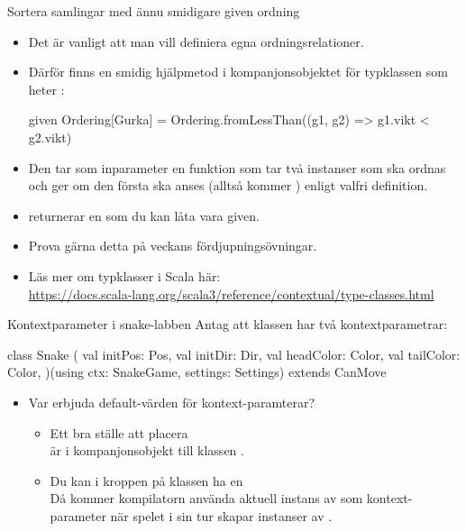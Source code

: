 \begin{Slide}{Sortera samlingar med ännu smidigare given ordning}\SlideFontSmall

\begin{itemize}
  \item Det är vanligt att man vill definiera egna ordningsrelationer.
  \item Därför finns en smidig hjälpmetod i kompanjonsobjektet för typklassen  som heter :
\begin{Code}
given Ordering[Gurka] = 
  Ordering.fromLessThan((g1, g2) => g1.vikt < g2.vikt)
\end{Code}
 
  \item Den tar som inparameter en funktion som tar två instanser som ska ordnas och ger  om den första ska anses  (alltså kommer ) enligt valfri definition. 
  \item {} returnerar en  som du kan låta vara given.
  \item Prova gärna detta på veckans fördjupningsövningar.
  \item Läs mer om typklasser i Scala här: \\ \url{https://docs.scala-lang.org/scala3/reference/contextual/type-classes.html}
\end{itemize}

\end{Slide}

\begin{Slide}{Kontextparameter i snake-labben}\SlideFontSmall
Antag att klassen  har två kontextparametrar:
\begin{Code}
class Snake (
  val initPos: Pos,
  val initDir: Dir,
  val headColor: Color,
  val tailColor: Color,
  )(using ctx: SnakeGame, settings: Settings) extends CanMove
\end{Code}
\begin{itemize}
  \item Var erbjuda default-värden för kontext-paramterar? \pause
  \begin{itemize}\SlideFontTiny
    \item Ett bra ställe att placera  \\är i kompanjonsobjekt till klassen .
  \item Du kan i kroppen på klassen  ha en  \\Då kommer kompilatorn använda aktuell instans av  som kontext-parameter när spelet i sin tur skapar instanser av .
\end{itemize}
\end{itemize}
\end{Slide}


